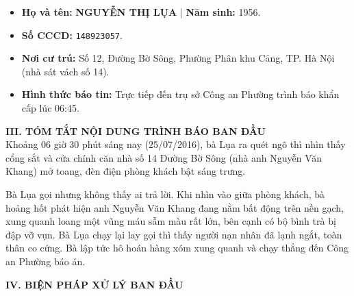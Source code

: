 \documentclass[12pt,a4paper]{article}
\begin{document}
\begin{itemize}[leftmargin=*, itemsep=2pt, topsep=2pt, parsep=0pt]
  \item \textbf{Họ và tên:} \textbf{NGUYỄN THỊ LỤA} | \textbf{Năm sinh:} 1956.
  \item \textbf{Số CCCD:} \texttt{148923057}.
  \item \textbf{Nơi cư trú:} Số 12, Đường Bờ Sông, Phường Phân khu Cảng, TP. Hà Nội (nhà sát vách số 14).
  \item \textbf{Hình thức báo tin:} Trực tiếp đến trụ sở Công an Phường trình báo khẩn cấp lúc 06:45.


\end{itemize}

\vspace{0.3cm}\noindent\textbf{\large III. TÓM TẮT NỘI DUNG TRÌNH BÁO BAN ĐẦU}\\[0.15cm]

Khoảng 06 giờ 30 phút sáng nay (25/07/2016), bà Lụa ra quét ngõ thì nhìn thấy cổng sắt và cửa chính căn nhà số 14 Đường Bờ Sông (nhà anh Nguyễn Văn Khang) mở toang, đèn điện phòng khách bật sáng trưng.


Bà Lụa gọi nhưng không thấy ai trả lời. Khi nhìn vào giữa phòng khách, bà hoảng hốt phát hiện anh Nguyễn Văn Khang đang nằm bất động trên nền gạch, xung quanh loang một vũng máu sẫm màu rất lớn, bên cạnh có bộ bình trà bị đập vỡ vụn. Bà Lụa chạy lại lay gọi thì thấy người nạn nhân đã lạnh ngắt, toàn thân co cứng. Bà lập tức hô hoán hàng xóm xung quanh và chạy thẳng đến Công an Phường báo án.




\vspace{0.3cm}\noindent\textbf{\large IV. BIỆN PHÁP XỬ LÝ BAN ĐẦU}\\[0.15cm]
\end{document}
